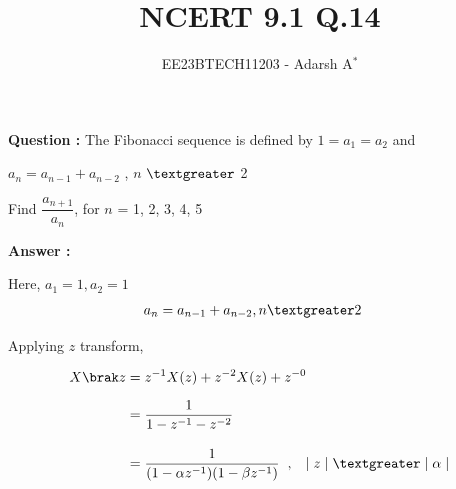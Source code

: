 \documentclass[journal,12pt,twocolumn]{IEEEtran}
\theoremstyle{remark}
\begin{document}
	
	
	\vspace{3cm}
	
	\title{NCERT 9.1 Q.14}
	\author{EE23BTECH11203 - Adarsh A$^{*}$%
	}
	\maketitle
	\bigskip
	
	\renewcommand{\thefigure}{\theenumi}
	\renewcommand{\thetable}{\theenumi}
	
	
	\vspace{0.2cm}
	\linespread{1.1}
	
	
	\textbf{\fontsize{13.5}{20}\selectfont Question : }
	\fontsize{13.5}{20}\selectfont The Fibonacci sequence is defined by $1 = a_1 = a_2$ and \par $a_n = a_{n-1} + a_{n-2}$ , $n$ $\textgreater$ 2
	
	\vspace{0.2cm}
	Find $\dfrac{a_{n + 1}}{a_n}$, for $n$ = 1, 2, 3, 4, 5
	
	\vspace{0.3cm}
	\textbf{\fontsize{13.5}{20}\selectfont Answer : }
	\vspace{0.3cm}
	\fontsize{13.5}{20}\selectfont 
	\fi
	
	
	\vspace{-0.2cm}
	
	\fontsize{13.5}{20}\selectfont
	Here, $a_1 = 1, a_2 = 1$
	\begin{align}
	a_n &= a_{n-1} + a_{n-2} , n \textgreater 2
	\end{align}
	\vspace{0.2cm}
	
	Applying $z$ transform,
	
	\vspace{-0.8cm}
	
	\begin{align}
		X\brak z	&= z^{-1} X(z) + z^{-2} X(z) + z^{-0}  \\[6pt]
		&= \dfrac{1}{1 - z^{-1} - z^{-2}}  \\[10pt]
		&= \dfrac{1}{(1 - \alpha z^{-1})(1 - \beta z^{-1})} \hspace{0.2cm}, \hspace{0.3cm}\lvert \hspace{0.1cm} z \hspace{0.1cm}\rvert \hspace{0.1cm} \textgreater \hspace{0.1cm} \lvert \hspace{0.1cm} \alpha \hspace{0.1cm} \rvert 				
	\end{align}
	
\end{document}
